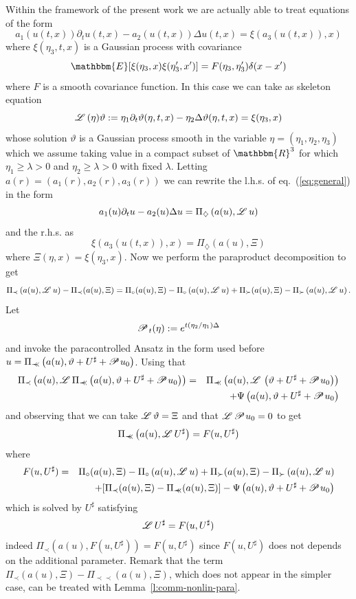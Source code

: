\documentclass[11pt,reqno]{amsart}
\newcommand{\assign}{:=}
\newcommand{\precprec}{\prec\!\!\!\prec}
\newcommand{\LL}{\mathscr{L} \hspace{.2em}}
\newcommand{\PP}{\mathscr{P} \hspace{.1em}}
\begin{document}
Within the framework of the present work we are actually able to treat
equations of the form
\begin{equation}
  a_1 (u (t, x)) \partial_t u (t, x) - a_2 (u (t, x)) \Delta u (t, x) = \xi
  (a_3 (u (t, x)), x) \label{eq:general}
\end{equation}
where $\xi (\eta_3, t, x)$ is a Gaussian process with covariance
\[ \mathbbm{E} [\xi (\eta_3, x) \xi (\eta'_3, x')] = F (\eta_3, \eta'_3)
   \delta (x - x') \]
where $F$ is a smooth covariance function. In this case we can take as
skeleton equation
\[ \LL (\eta) \vartheta \assign \eta_1 \partial_t \vartheta (\eta, t, x) -
   \eta_2 \Delta \vartheta (\eta, t, x) = \xi (\eta_3, x) \]
whose solution $\vartheta$ is a Gaussian process smooth in the variable $\eta
= (\eta_1, \eta_2, \eta_3)$ which we assume taking value in a compact subset
of $\mathbbm{R}^3$ for which $\eta_1 \geqslant \lambda > 0$ and $\eta_2
\geqslant \lambda > 0$ with fixed $\lambda$. Letting $a (r) = (a_1 (r), a_2
(r), a_3 (r))$ we can rewrite the l.h.s. of eq.~(\ref{eq:general}) in the form
\[ a_1 (u) \partial_t u - a_2 (u) \Delta u = \Pi_{\diamondsuit} \left( a (u),
   \LL u \right) \]
and the r.h.s. as
\[ \xi (a_3 (u (t, x)), x) = \Pi_{\diamondsuit} (a (u), \Xi) \]
where $\Xi (\eta, x) = \xi (\eta_3, x)$. Now we perform the paraproduct
decomposition to get
\[ \Pi_{\prec} \left( a (u), \LL u \right) - \Pi_{\prec} (a (u), \Xi) =
   \Pi_{\circ} (a (u), \Xi) - \Pi_{\circ} \left( a (u), \LL u \right) +
   \Pi_{\succ} (a (u), \Xi) - \Pi_{\succ} \left( a (u), \LL u \right) . \]
Let
\[ \PP_t (\eta) \assign e^{t (\eta_2 / \eta_1) \Delta} \]
and invoke the paracontrolled Ansatz in the form used before $u =
\Pi_{\precprec} \left( a (u), \vartheta + U^{\sharp} + \PP u_0 \right)$. Using
that
\begin{eqnarray*}
  \Pi_{\prec} \left( a (u), \LL \Pi_{\precprec} \left( a (u), \vartheta +
  U^{\sharp} + \PP u_0 \right) \right) & = & \Pi_{\precprec} \left( a (u), \LL
  \left( \vartheta + U^{\sharp} + \PP u_0 \right) \right)\\
  &  & + \Psi \left( a (u), \vartheta + U^{\sharp} + \PP u_0 \right)
\end{eqnarray*}
and observing that we can take $\LL \vartheta = \Xi$ and that $\LL \PP u_0 =
0$ to get
\[ \Pi_{\precprec} \left( a (u), \LL U^{\sharp} \right) = F (u, U^{\sharp}) \]
where
\begin{eqnarray*}
  F (u, U^{\sharp}) & = & \Pi_{\circ} (a (u), \Xi) - \Pi_{\circ} \left( a (u),
  \LL u \right) + \Pi_{\succ} (a (u), \Xi) - \Pi_{\succ} \left( a (u), \LL u
  \right)\\
  &  & + [\Pi_{\prec} (a (u), \Xi) - \Pi_{\precprec} (a (u), \Xi)] - \Psi
  \left( a (u), \vartheta + U^{\sharp} + \PP u_0 \right)
\end{eqnarray*}
which is solved by $U^{\sharp}$ satisfying
\[ \LL U^{\sharp} = F (u, U^{\sharp}) \]
indeed $\Pi_{\prec} (a (u), F (u, U^{\sharp})) = F (u, U^{\sharp})$ since $F (u, U^{\sharp})$ does not depends on the additional parameter. Remark
that the term $\Pi_{\prec} (a (u), \Xi) - \Pi_{\precprec} (a (u), \Xi)$, which
does not appear in the simpler case, can be treated with
Lemma~\ref{l:comm-nonlin-para}.
\end{document}
